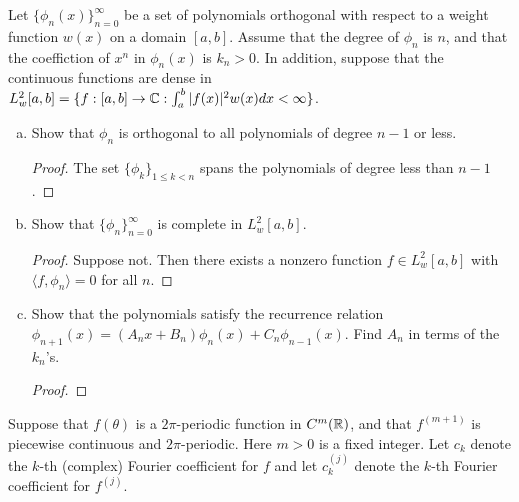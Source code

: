 \documentclass{article}
\begin{document}
  
  Let $\{\phi_n(x)\}_{n=0}^\infty$ be a set of polynomials orthogonal with respect to a weight function $w(x)$ on a domain $[a,b]$. Assume that the degree of $\phi_n$ is $n$, and that the coeffiction of $x^n$ in $\phi_n(x)$ is $k_n > 0$. In addition, suppose that the continuous functions are dense in $L_w^2[a,b] = \{f : [a,b] \to \mathbb{C} : \int_a^b |f(x)|^2 w(x) dx < \infty \}$.

\begin{enumerate}[(a)]
\item Show that $\phi_n$ is orthogonal to all polynomials of degree $n - 1$ or less.
\begin{proof}
The set $\{\phi_k\}_{1 \le k < n}$ spans the polynomials of degree less than $n-1$.
\end{proof}
\item Show that $\{ \phi_n \}_{n=0}^\infty$ is complete in $L_w^2[a,b]$.
\begin{proof}
Suppose not.  Then there exists a nonzero function $f \in L_w^2[a,b]$ with $\langle f, \phi_n \rangle = 0$ for all $n$.
\end{proof}
\item Show that the polynomials satisfy the recurrence relation $\phi_{n+1}(x) = (A_nx + B_n) \phi_n(x) + C_n \phi_{n-1}(x)$. Find $A_n$ in terms of the $k_n$'s.  
\begin{proof}

\end{proof}
\end{enumerate}


 Suppose that $f(\theta)$ is a $2 \pi$-periodic function in $C^m( \mathbb{R})$, and that $f^{(m+1)}$ is piecewise continuous and $2 \pi$-periodic. Here $m > 0$ is a fixed integer.  Let $c_k$ denote the $k$-th (complex) Fourier coefficient for $f$ and let $c_k^{(j)}$ denote the $k$-th Fourier coefficient for $f^{(j)}$.

\newcommand{\ckj}{c_k^{(j)}}
\end{document}
